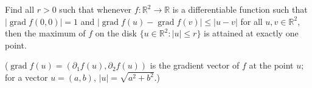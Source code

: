 Find all \(r > 0\) such that whenever \(f \colon \mathbb{R}^2 \to \mathbb{R}\) is a differentiable function such that \(|\operatorname{grad}f(0,0)| = 1\) and \(|\operatorname{grad}f(u) - \operatorname{grad} f(v)| \le |u - v|\) for all \(u,v \in \mathbb{R}^2\), then the maximum of \(f\) on the disk \(\{u \in \mathbb{R}^2 : |u| \le r\}\) is attained at exactly one point.

(\(\operatorname{grad} f(u) = (\partial_1 f(u), \partial_2 f(u))\) is the gradient vector of \(f\) at the point \(u\); for a vector \(u = (a,b)\), \(|u| = \sqrt{a^2 + b^2}\).)